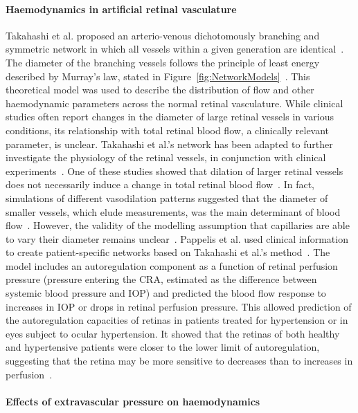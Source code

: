 \documentclass{article}
\begin{document}
\paragraph*{Haemodynamics in artificial retinal vasculature}

Takahashi et al. proposed an arterio-venous dichotomously branching and symmetric network in which all vessels within a given generation are identical~\cite{Takahashi_2009}.
The diameter of the branching vessels follows the principle of least energy described by Murray's law, stated in Figure~\ref{fig:NetworkModels}~\cite{Murray_1926}.
This theoretical model was used to describe the distribution of flow and other haemodynamic parameters across the normal retinal vasculature.
While clinical studies often report changes in the diameter of large retinal vessels in various conditions, its relationship with total retinal blood flow, a clinically relevant parameter, is unclear.
Takahashi et al.'s network has been adapted to further investigate the physiology of the retinal vessels, in conjunction with clinical experiments~\cite{Aschinger_2017,Pappelis_2020}.
One of these studies showed that dilation of larger retinal vessels does not necessarily induce a change in total retinal blood flow~\cite{Aschinger_2017}.
In fact, simulations of different vasodilation patterns suggested that the diameter of smaller vessels, which elude measurements, was the main determinant of blood flow~\cite{Aschinger_2017}.
However, the validity of the modelling assumption that capillaries are able to vary their diameter remains unclear~\cite{Kur_2012}.
Pappelis et al. used clinical information to create patient-specific networks based on Takahashi et al.'s method~\cite{Pappelis_2020}.
The model includes an autoregulation component as a function of retinal perfusion pressure (pressure entering the CRA, estimated as the difference between systemic blood pressure and IOP) and predicted the blood flow response to increases in IOP or drops in retinal perfusion pressure.
This allowed prediction of the autoregulation capacities of retinas in patients treated for hypertension or in eyes subject to ocular hypertension.
It showed that the retinas of both healthy and hypertensive patients were closer to the lower limit of autoregulation, suggesting that the retina may be more sensitive to decreases than to increases in perfusion~\cite{Pappelis_2020}.


\paragraph*{Effects of extravascular pressure on haemodynamics} %
\end{document}
